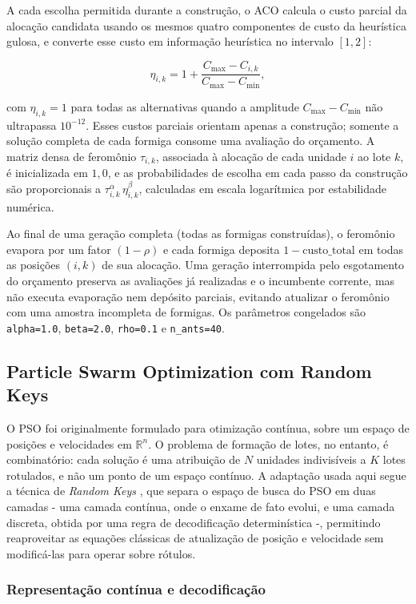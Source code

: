 \documentclass[12pt,a4paper]{article}
\begin{document}
A cada escolha permitida durante a construção, o ACO calcula o custo parcial
da alocação candidata usando os mesmos quatro componentes de custo da
heurística gulosa, e converte esse custo em informação heurística no
intervalo $[1,2]$:

\[
\eta_{i,k} = 1 + \frac{C_{\max} - C_{i,k}}{C_{\max} - C_{\min}},
\]

com $\eta_{i,k}=1$ para todas as alternativas quando a amplitude
$C_{\max}-C_{\min}$ não ultrapassa $10^{-12}$. Esses custos parciais orientam
apenas a construção; somente a solução completa de cada formiga consome uma
avaliação do orçamento. A matriz densa de feromônio $\tau_{i,k}$, associada
à alocação de cada unidade $i$ ao lote $k$, é inicializada em $1{,}0$, e as
probabilidades de escolha em cada passo da construção são proporcionais a
$\tau_{i,k}^{\alpha}\,\eta_{i,k}^{\beta}$, calculadas em escala logarítmica
por estabilidade numérica.

Ao final de uma geração completa (todas as formigas construídas), o
feromônio evapora por um fator $(1-\rho)$ e cada formiga deposita
$1-\text{custo\_total}$ em todas as posições $(i,k)$ de sua alocação. Uma
geração interrompida pelo esgotamento do orçamento preserva as avaliações já
realizadas e o incumbente corrente, mas não executa evaporação nem depósito
parciais, evitando atualizar o feromônio com uma amostra incompleta de
formigas. Os parâmetros congelados são \texttt{alpha=1.0}, \texttt{beta=2.0},
\texttt{rho=0.1} e \texttt{n\_ants=40}.

\subsection{Particle Swarm Optimization com Random Keys}
\label{subsec:pso}

O PSO \cite{kennedy1995} foi originalmente formulado para otimização
contínua, sobre um espaço de posições e velocidades em $\mathbb{R}^n$. O
problema de formação de lotes, no entanto, é combinatório: cada solução é
uma atribuição de $N$ unidades indivisíveis a $K$ lotes rotulados, e não um
ponto de um espaço contínuo. A adaptação usada aqui segue a técnica de
\emph{Random Keys} \cite{bean1994}, que separa o espaço de busca do PSO em
duas camadas - uma camada contínua, onde o enxame de fato evolui, e uma
camada discreta, obtida por uma regra de decodificação determinística -,
permitindo reaproveitar as equações clássicas de atualização de posição e
velocidade sem modificá-las para operar sobre rótulos.

\subsubsection*{Representação contínua e decodificação}
\end{document}
